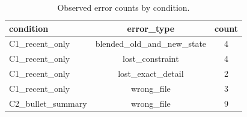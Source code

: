 \begin{table}[t]
\centering
\begin{tabular}{lcc}
\hline
condition & error_type & count \\
\hline
C1_recent_only & blended_old_and_new_state & 4 \\
C1_recent_only & lost_constraint & 4 \\
C1_recent_only & lost_exact_detail & 2 \\
C1_recent_only & wrong_file & 3 \\
C2_bullet_summary & wrong_file & 9 \\
\hline
\end{tabular}
\caption{Observed error counts by condition.}
\label{tab:error-breakdown}
\end{table}
